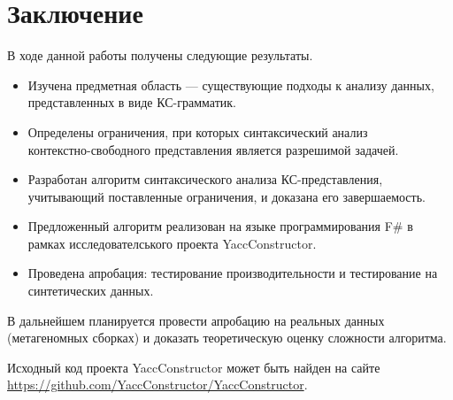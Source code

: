 \section*{Заключение}

В ходе данной работы получены следующие результаты.

\begin{itemize}
	\item Изучена предметная область --- существующие подходы к анализу данных, представленных в виде КС-грамматик.
	\item Определены ограничения, при которых синтаксический анализ \\ контекстно-свободного представления является разрешимой задачей.
	\item Разработан алгоритм синтаксического анализа КС-представления, учитывающий поставленные ограничения, и доказана его завершаемость.
	\item Предложенный алгоритм реализован на языке программирования F$\#$ в рамках исследователського проекта YaccConstructor.
	\item Проведена апробация: тестирование производительности и тестирование на синтетических данных.
\end{itemize}

В дальнейшем планируется провести апробацию на реальных данных (метагеномных сборках) и доказать теоретическую оценку сложности алгоритма.

Исходный код проекта YaccConstructor может быть найден на сайте \url{https://github.com/YaccConstructor/YaccConstructor}. 